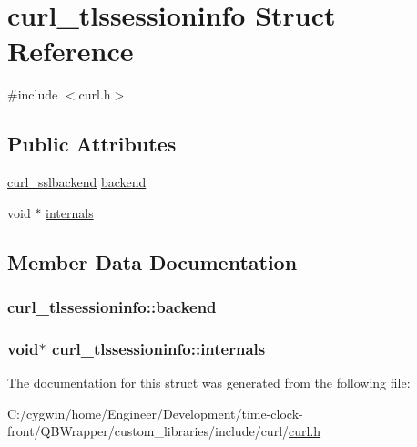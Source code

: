 \hypertarget{structcurl__tlssessioninfo}{}\section{curl\+\_\+tlssessioninfo Struct Reference}
\label{structcurl__tlssessioninfo}


{\ttfamily \#include $<$curl.\+h$>$}

\subsection*{Public Attributes}
\begin{DoxyCompactItemize}
\item 
\hyperlink{curl_8h_a908c5b707ac681212b8f8688cf76689d}{curl\+\_\+sslbackend} \hyperlink{structcurl__tlssessioninfo_a7ee41782ebe1a14c335dd2ff172bd3e1}{backend}
\item 
void $\ast$ \hyperlink{structcurl__tlssessioninfo_a9e81ab20dc7b96a491385baf471df847}{internals}
\end{DoxyCompactItemize}


\subsection{Member Data Documentation}
\hypertarget{structcurl__tlssessioninfo_a7ee41782ebe1a14c335dd2ff172bd3e1}{}
\subsubsection[{backend}]{ curl\+\_\+tlssessioninfo\+::backend}\label{structcurl__tlssessioninfo_a7ee41782ebe1a14c335dd2ff172bd3e1}
\hypertarget{structcurl__tlssessioninfo_a9e81ab20dc7b96a491385baf471df847}{}
\subsubsection[{internals}]{\setlength{\rightskip}{0pt plus 5cm}void$\ast$ curl\+\_\+tlssessioninfo\+::internals}\label{structcurl__tlssessioninfo_a9e81ab20dc7b96a491385baf471df847}


The documentation for this struct was generated from the following file\+:\begin{DoxyCompactItemize}
\item 
C\+:/cygwin/home/\+Engineer/\+Development/time-\/clock-\/front/\+Q\+B\+Wrapper/custom\+\_\+libraries/include/curl/\hyperlink{curl_8h}{curl.\+h}\end{DoxyCompactItemize}
